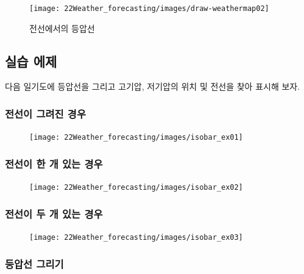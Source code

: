 \begin{figure}[h]
	\centering
	\texttt{[image: 22Weather\_forecasting/images/draw-weathermap02]}
	\caption{전선에서의 등압선}
	\label{fig:drawweathermap02}
\end{figure}

\newpage
\subsection{실습 에제}
다음 일기도에 등압선을 그리고 고기압, 저기압의 위치 및 전선을 찾아 표시해 보자.

\subsubsection{전선이 그려진 경우}

\begin{figure}[h]\center
	\centering
	\texttt{[image: 22Weather\_forecasting/images/isobar\_ex01]}
	\label{fig:isobar_ex01}
\end{figure}

\newpage
\subsubsection{전선이 한 개 있는 경우}

\begin{figure}[h]\center
	\centering
	\texttt{[image: 22Weather\_forecasting/images/isobar\_ex02]}
	\label{fig:isobar_ex02}
\end{figure}

\newpage
\subsubsection{전선이 두 개 있는 경우}

\begin{figure}[h]\center
	\centering
	\texttt{[image: 22Weather\_forecasting/images/isobar\_ex03]}
	\label{fig:isobar_ex03}
\end{figure}

\newpage
\subsubsection{등압선 그리기}

